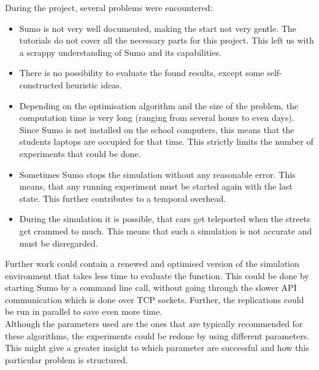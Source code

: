 \documentclass[./\jobname.tex]{subfiles}
\begin{document}
During the project, several problems were encountered:  

\begin{itemize}
	\item Sumo is not very well documented, making the start not very gentle. The tutorials do not cover all the necessary parts for this project. This left us with a scrappy understanding of Sumo and its capabilities. 
	
	\item There is no possibility to evaluate the found results, except some self-constructed heuristic ideas. 
	
	\item Depending on the optimisation algorithm and the size of the problem, the computation time is very long (ranging from several hours to even days). Since Sumo is not installed on the school computers, this means that the students laptops are occupied for that time. This strictly limits the number of experiments that could be done. 
	
	\item Sometimes Sumo stops the simulation without any reasonable error. This means, that any running experiment must be started again with the last state. This further contributes to a temporal overhead. 
	
	\item During the simulation it is possible, that cars get teleported when the streets get crammed to much. This means that such a simulation is not accurate and must be disregarded. 
\end{itemize}


Further work could contain a renewed and optimised version of the simulation environment that takes less time to evaluate the function. This could be done by starting Sumo by a command line call, without going through the slower API communication which is done over TCP sockets. Further, the replications could be run in parallel to save even more time. \\
Although the parameters used are the ones that are typically recommended for these algorithms, the experiments could be redone by using different parameters. This might give a greater insight to which parameter are successful and how this particular problem is structured. 
\end{document}
